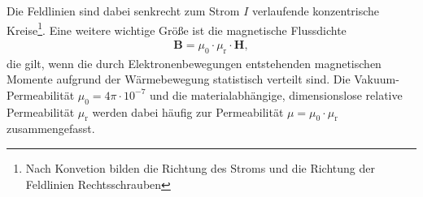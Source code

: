 Die Feldlinien sind dabei senkrecht zum Strom $I$ verlaufende konzentrische Kreise\footnote{Nach Konvetion
bilden die Richtung des Stroms und die Richtung der Feldlinien Rechtsschrauben}.
\noindent
Eine weitere wichtige Größe ist die magnetische Flussdichte
\begin{align}
    \symbf{B} = \mu_0 \cdot \mu_\text{r} \cdot \symbf{H},
\end{align}
die gilt, wenn die durch Elektronenbewegungen entstehenden magnetischen Momente aufgrund der 
Wärmebewegung statistisch verteilt sind.
Die Vakuum-Permeabilität $\mu_0 = 4 \pi \cdot 10^{-7}$ und die materialabhängige, dimensionslose relative Permeabilität $\mu_\text{r}$
werden dabei häufig zur Permeabilität $\mu = \mu_0 \cdot \mu_\text{r}$ zusammengefasst.


